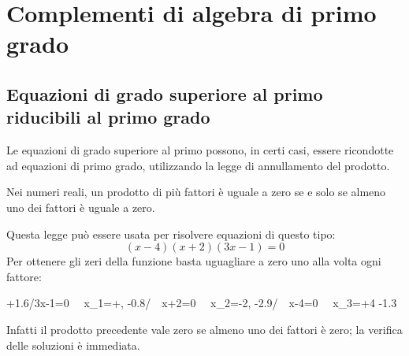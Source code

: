 


\chapter{Complementi di algebra di primo grado}


\section{Equazioni di grado superiore al primo riducibili al primo 
grado}
\label{sec:compl1_eqgradosup}

Le equazioni di grado superiore al primo possono, in certi casi, essere 
ricondotte ad equazioni di primo grado, utilizzando la legge di 
annullamento del prodotto.

\begin{definizione}{}{}
Nei numeri reali, un prodotto di più fattori è uguale a zero se e solo 
se almeno uno dei fattori è uguale a zero.
\end{definizione}

Questa legge può essere usata per risolvere equazioni di questo tipo:
\[(x-4)(x+2)(3x-1)=0\]
Per ottenere gli zeri della funzione basta uguagliare a zero uno alla 
volta ogni fattore:
\begin{center} 
                 {+1.6/{3x-1=0~ \sRarrow ~x_1=+},
                  -0.8/{~~x+2=0~ \sRarrow ~x_2=-2},
                  -2.9/{~~x-4=0~ \sRarrow ~x_3=+4}}
                 {-1.3}
\end{center} 
Infatti il prodotto precedente vale zero se almeno uno dei fattori è 
zero; la verifica delle soluzioni è immediata.

